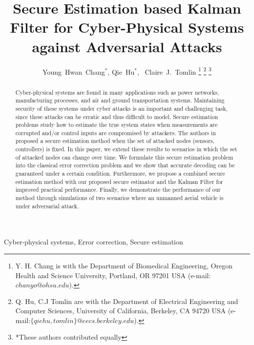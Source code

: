 \documentclass[journal]{IEEEtran}
\begin{document}
\title{Secure Estimation based Kalman Filter for Cyber-Physical Systems against Adversarial Attacks}





\author{Young~Hwan~Chang$^*$, Qie~Hu$^*$, ~Claire~J.~Tomlin
\thanks{Y. H. Chang is with the Department of Biomedical Engineering, Oregon Health and Science University, Portland, OR 97201 USA (e-mail:$chanyo@ohsu.edu$).}
\thanks{Q. Hu, C.J Tomlin are with the Department of Electrical Engineering and Computer Sciences, University of California, Berkeley, CA 94720 USA (e-mail:$\{qiehu, tomlin\}@eecs.berkeley.edu$).}
\thanks{*These authors contributed equally}}










\maketitle

\begin{abstract}
Cyber-physical systems are found in many applications such as power networks, manufacturing processes, and air and ground transportation systems. Maintaining security of these systems under cyber attacks is an important and challenging task, since these attacks can be erratic and thus difficult to model. Secure estimation problems study how to estimate the true system states when  measurements are corrupted and/or control inputs are compromised by attackers. The authors in \cite{Fawzi2014} proposed a secure estimation method when the set of attacked nodes (sensors, controllers) is fixed. In this paper, we extend these results to scenarios in which the set of attacked nodes can change over time. We formulate this secure estimation problem into the classical error correction problem \cite{Candes_Tao} and we show that accurate decoding can be guaranteed under a certain condition.
Furthermore, we propose a combined secure estimation method with our proposed secure estimator and the Kalman Filter for improved practical performance. Finally,  we demonstrate the performance of our method through simulations of two scenarios where an unmanned aerial vehicle is under adversarial attack.

\end{abstract}



\begin{IEEEkeywords}
Cyber-physical systems, Error correction, Secure estimation
\end{IEEEkeywords}
\end{document}
